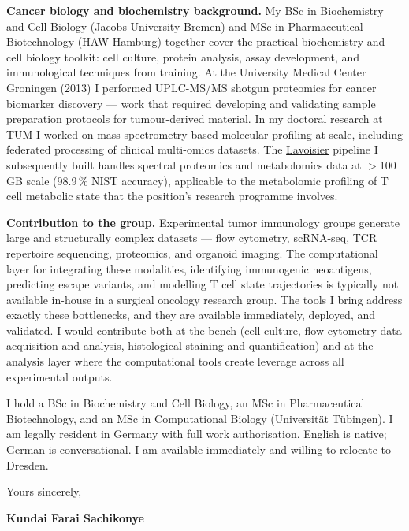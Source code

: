 \documentclass[12pt,a4paper]{article}
\begin{document}
\textbf{Cancer biology and biochemistry background.}
My BSc in Biochemistry and Cell Biology (Jacobs University Bremen) and
MSc in Pharmaceutical Biotechnology (HAW Hamburg) together cover the practical
biochemistry and cell biology toolkit: cell culture, protein analysis, assay
development, and immunological techniques from training.
At the University Medical Center Groningen (2013) I performed UPLC-MS/MS
shotgun proteomics for cancer biomarker discovery --- work that required
developing and validating sample preparation protocols for tumour-derived
material. In my doctoral research at TUM I worked on mass spectrometry-based
molecular profiling at scale, including federated processing of clinical
multi-omics datasets.
The \href{https://github.com/fullscreen-triangle/lavoisier}{Lavoisier} pipeline
I subsequently built handles spectral proteomics and metabolomics data at
$>$100\,GB scale (98.9\,\% NIST accuracy), applicable to the metabolomic
profiling of T cell metabolic state that the position's research programme
involves.

\textbf{Contribution to the group.}
Experimental tumor immunology groups generate large and structurally complex
datasets --- flow cytometry, scRNA-seq, TCR repertoire sequencing, proteomics,
and organoid imaging. The computational layer for integrating these modalities,
identifying immunogenic neoantigens, predicting escape variants, and modelling
T cell state trajectories is typically not available in-house in a surgical
oncology research group.
The tools I bring address exactly these bottlenecks, and they are available
immediately, deployed, and validated. I would contribute both at the bench
(cell culture, flow cytometry data acquisition and analysis, histological
staining and quantification) and at the analysis layer where the computational
tools create leverage across all experimental outputs.

I hold a BSc in Biochemistry and Cell Biology, an MSc in Pharmaceutical
Biotechnology, and an MSc in Computational Biology (Universität Tübingen).
I am legally resident in Germany with full work authorisation.
English is native; German is conversational. I am available immediately and
willing to relocate to Dresden.

\vspace{1.5em}
Yours sincerely,

\vspace{2.5em}
\textbf{Kundai Farai Sachikonye}
\end{document}
